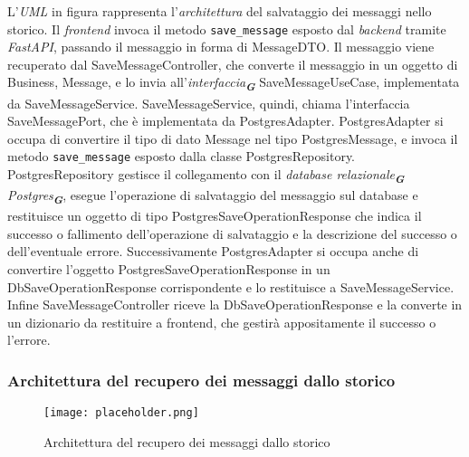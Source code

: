 L'\emph{UML} in figura rappresenta l'\emph{architettura} del salvataggio dei messaggi nello storico.
Il \emph{frontend} invoca il metodo \texttt{save\_message} esposto dal \emph{backend} tramite \emph{FastAPI}, passando il messaggio in forma di MessageDTO.
Il messaggio viene recuperato dal SaveMessageController, che converte il messaggio in un oggetto di Business, Message, e lo invia all'\emph{interfaccia}\textsubscript{\textbf{\textit{G}}} SaveMessageUseCase, implementata da SaveMessageService.
SaveMessageService, quindi, chiama l'interfaccia SaveMessagePort, che è implementata da PostgresAdapter.
PostgresAdapter si occupa di convertire il tipo di dato Message nel tipo PostgresMessage, e invoca il metodo \texttt{save\_message} esposto dalla classe PostgresRepository.
PostgresRepository gestisce il collegamento con il \emph{database relazionale}\textsubscript{\textbf{\textit{G}}} \emph{Postgres}\textsubscript{\textbf{\textit{G}}},
esegue l'operazione di salvataggio del messaggio sul database e restituisce un oggetto di tipo PostgresSaveOperationResponse che indica il successo o fallimento dell'operazione di salvataggio e la descrizione del successo o dell'eventuale errore.
Successivamente PostgresAdapter si occupa anche di convertire l'oggetto PostgresSaveOperationResponse in un DbSaveOperationResponse corrispondente e lo restituisce a SaveMessageService.
Infine SaveMessageController riceve la DbSaveOperationResponse e la converte in un dizionario da restituire a frontend, che gestirà appositamente il successo o l'errore.

\newpage


\subsubsection{Architettura del recupero dei messaggi dallo storico}
\label{sec:architettura_recupero_messaggi_storico}

\begin{figure}[h]
    \centering
    \texttt{[image: placeholder.png]}
    \caption{Architettura del recupero dei messaggi dallo storico}
\end{figure}

